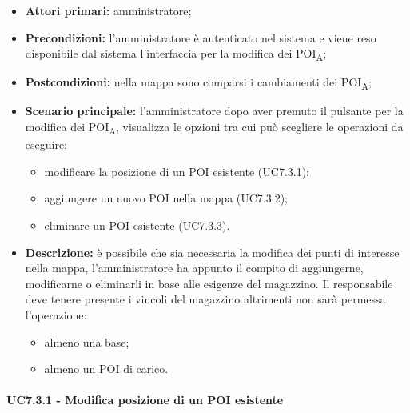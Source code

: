 \begin{itemize}

\item   \textbf{Attori primari:} amministratore;

 \item   \textbf{Precondizioni:} l'amministratore è autenticato nel sistema e viene reso disponibile dal sistema l'interfaccia per la modifica dei POI\textsubscript{A};

 \item   \textbf{Postcondizioni:} nella mappa sono comparsi i cambiamenti dei POI\textsubscript{A}; 

\item   \textbf{Scenario principale:} l'amministratore dopo aver premuto il pulsante per la modifica dei POI\textsubscript{A}, visualizza le opzioni tra cui può scegliere le operazioni da eseguire:

  \begin{itemize}

    \item modificare la posizione di un POI esistente (UC7.3.1);

    \item aggiungere un nuovo POI nella mappa (UC7.3.2);

   \item eliminare un POI esistente (UC7.3.3).

 \end{itemize}

\item   \textbf{Descrizione:} è possibile che sia necessaria la modifica dei punti di interesse nella mappa, l'amministratore ha appunto il compito di aggiungerne, modificarne o eliminarli in base alle esigenze del magazzino. Il responsabile deve tenere presente i vincoli del magazzino altrimenti non sarà permessa l'operazione:

  \begin{itemize}

\item almeno una base;

\item almeno un POI di carico.

\end{itemize}

\end{itemize}



\paragraph{UC7.3.1 - Modifica posizione di un POI esistente}



